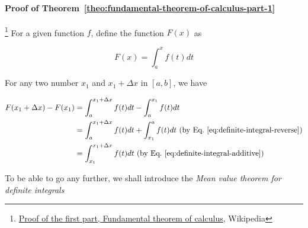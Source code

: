 \paragraph{Proof of Theorem~\ref{theo:fundamental-theorem-of-calculus-part-1}}

\footnote{\href{https://en.wikipedia.org/wiki/Fundamental_theorem_of_calculus\#Proof\_of\_the\_first\_part}{Proof of the first part, Fundamental theorem of calculus}, Wikipedia}
For a given function $f$, define the function $F(x)$ as

\[
    F(x) = \int_a^x f(t) dt
\]

For any two number $x_1$ and $x_1 + \Delta x$ in $[a, b]$, we have

\begin{align}
    F(x_1 + \Delta x) - F(x_1) &= \int_a^{x_1 + \Delta x} f(t) dt - \int_a^{x_1} f(t) dt \\
    &= \int_a^{x_1 + \Delta x} f(t) dt + \int_{x_1}^a f(t) dt \text{ (by Eq.~\ref{eq:definite-integral-reverse})}\\
    &= \int_{x_1}^{x_1 + \Delta x} f(t)dt\label{eq:F-del-x-minus-F} \text{ (by Eq.~\ref{eq:definite-integral-additive})}
\end{align}

To be able to go any further, we shall introduce the \textit{Mean value theorem for definite integrals}

